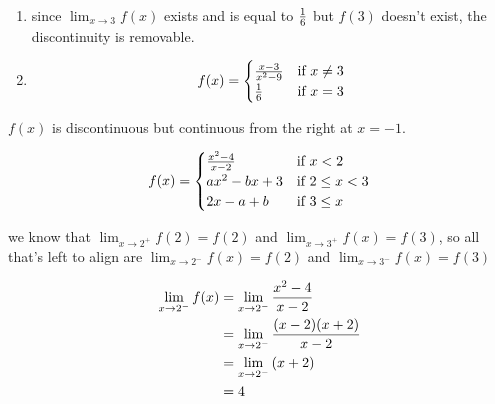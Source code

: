\documentclass{../../../classes/anal}
\begin{document}

    \begin{enumerate}[label={(\alph*)}]
        \item {since \(\lim_{x\to3}f(x)\) exists and is equal to \({1 \over 6}\) but \(f(3)\) doesn't exist, the discontinuity is removable.}
        \item {\[f(x) = \begin{cases}
            {x - 3 \over x^2 - 9} & \text{if} \ x \neq 3 \\
            {1 \over 6} & \text{if} \ x = 3 \\
        \end{cases}\]}
    \end{enumerate}


    \(f(x)\) is discontinuous but continuous from the right at \(x=-1\).



    \begin{equation*}
        f(x) = \begin{cases}
            {x^2 - 4 \over x - 2} & \text{if} \ x < 2 \\
            {ax^2 - bx + 3} & \text{if} \ 2 \leq x < 3 \\
            {2x - a + b} & \text{if} \ 3 \leq x 
        \end{cases}
    \end{equation*}
    
    we know that $\lim_{x\to2^+}f(2) = f(2)$ and $\lim_{x\to3^+}f(x) = f(3)$, so all that's left to align are $\lim_{x\to2^-}f(x) = f(2)$ and $\lim_{x\to3^-}f(x) = f(3)$

    \begin{equation}
        \begin{aligned}
            \lim_{x\to2^-}f(x) 
            &= \lim_{x\to2^-}{x^2 - 4 \over x - 2} \\ 
            &= \lim_{x\to2^-}{(x - 2)(x + 2) \over x - 2} \\ 
            &= \lim_{x\to2^-}{(x + 2)} \\ 
            &= 4
        \end{aligned}
    \end{equation}
\end{document}
